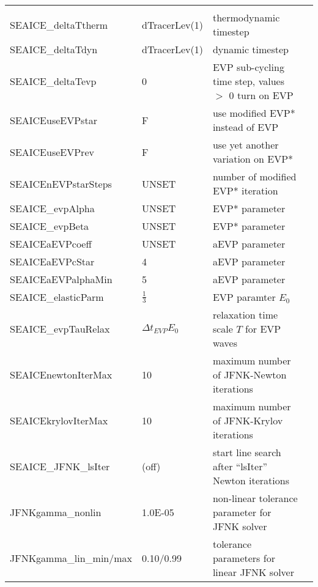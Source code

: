 \begin{table}[!ht]
{\begin{tabular}{|llp{5cm}c|}
    &  %
    \\
   SEAICE\_deltaTtherm  &                   dTracerLev(1)
    &   thermodynamic timestep 
    &  %
    \\
   SEAICE\_deltaTdyn    &                   dTracerLev(1)
    &   dynamic timestep 
    &  %
    \\
   SEAICE\_deltaTevp    &                   0
    &   EVP sub-cycling time step, values $>$ 0 turn on EVP
    &  
    \\
   SEAICEuseEVPstar    & F & use modified EVP* instead of EVP & %
    \\
   SEAICEuseEVPrev     & F & use yet another variation on EVP* & %
    \\
   SEAICEnEVPstarSteps & UNSET & number of modified EVP* iteration & %
    \\
   SEAICE\_evpAlpha & UNSET & EVP* parameter & %
    \\
   SEAICE\_evpBeta & UNSET & EVP* parameter & %
    \\
    SEAICEaEVPcoeff & UNSET & aEVP parameter & %
    \\
    SEAICEaEVPcStar & 4 & aEVP parameter & \citep{kimmritz16}
    \\
    SEAICEaEVPalphaMin & 5 & aEVP parameter & \citep{kimmritz16}
    \\
   SEAICE\_elasticParm & $\frac{1}{3}$ 
     & EVP paramter $E_0$ & \\
   SEAICE\_evpTauRelax & $\Delta{t}_{EVP}E_0$ 
     & relaxation time scale $T$ for EVP waves & \\
    SEAICEnewtonIterMax & 10
    & maximum number of JFNK-Newton iterations
    &  %
    \\
    SEAICEkrylovIterMax & 10
    & maximum number of JFNK-Krylov iterations
    &  %
    \\
    SEAICE\_JFNK\_lsIter & (off)
    & start line search after ``lsIter'' Newton iterations
    &  %
    \\
    JFNKgamma\_nonlin        & 1.0E-05
    & non-linear tolerance parameter for JFNK solver
    &  %
    \\
    JFNKgamma\_lin\_min/max  & 0.10/0.99
    & tolerance parameters for linear JFNK solver

\end{tabular}}
\end{table}
